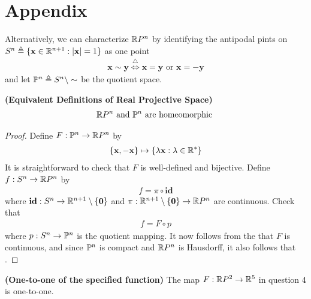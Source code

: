 \documentclass{report}
\begin{document}
\section{Appendix}
\begin{mdframed}
Alternatively, we can characterize $\R P^n$ by identifying the antipodal pints on $S^n\triangleq \set{\textbf{x}\inr^{n+1}:\abso{\textbf{x}}=1}$ as one point 
\begin{align*}
\textbf{x}\sim \textbf{y}\overset{\triangle}{\iff } \textbf{x}=\textbf{y}\text{ or }\textbf{x}=-\textbf{y}
\end{align*}
and let $\P^n\triangleq S^n\setminus \sim $ be the quotient space.
\end{mdframed}
\begin{theorem}
\label{RPnhom}
\textbf{(Equivalent Definitions of Real Projective Space)} 
\begin{align*}
\RP^n\text{ and }\P^n\text{ are homeomorphic }
\end{align*}
\end{theorem}
\begin{proof}
Define $F:\P^n\rightarrow \RP^n$ by 
\begin{align*}
\set{\textbf{x},-\textbf{x}}\mapsto \set{\ld  \textbf{x}:\ld \inr^*}
\end{align*}
It is straightforward to check that $F$ is well-defined and bijective. Define $f:S^n \rightarrow \R P^n$ by 
\begin{align*}
f= \pi \circ \textbf{id}
\end{align*}
where $\textbf{id}:S^n \rightarrow \R^{n+1}\setminus \set{\textbf{0}}$ and $\pi:\R^{n+1}\setminus \set{\textbf{0}}\rightarrow \R P^n$ are continuous. Check that  
\begin{align*}
f=F\circ p
\end{align*}
where $p:S^n\rightarrow \P^n$ is the quotient mapping. It now follows from the  that $F$ is continuous, and since $\P^n$ is compact and  $\R P^n$ is Hausdorff,  it also follows that  . 
\end{proof}
\begin{theorem}
\label{ono}
\textbf{(One-to-one of the specified function)} The map $F:\R P^2\rightarrow \R^5$ in question 4 is one-to-one. 
\end{theorem}
\end{document}
